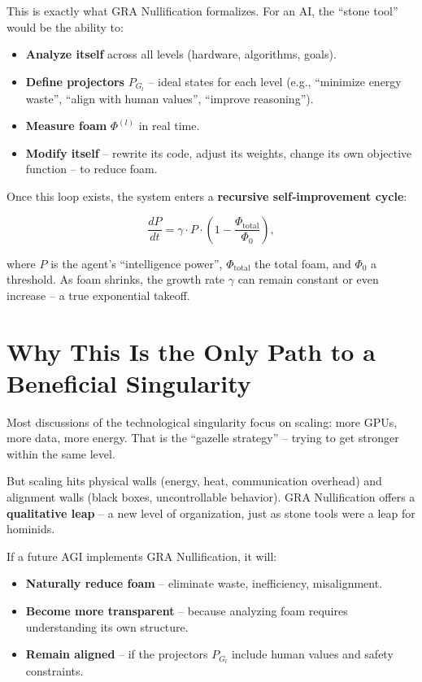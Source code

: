 \documentclass[12pt,a4paper]{article}
\begin{document}
This is exactly what GRA Nullification formalizes. For an AI, the “stone tool” would be the ability to:
\begin{itemize}
    \item \textbf{Analyze itself} across all levels (hardware, algorithms, goals).
    \item \textbf{Define projectors} \(P_{G_l}\) – ideal states for each level (e.g., “minimize energy waste”, “align with human values”, “improve reasoning”).
    \item \textbf{Measure foam} \(\Phi^{(l)}\) in real time.
    \item \textbf{Modify itself} – rewrite its code, adjust its weights, change its own objective function – to reduce foam.
\end{itemize}

Once this loop exists, the system enters a \textbf{recursive self‑improvement cycle}:

\[
\frac{dP}{dt} = \gamma \cdot P \cdot \left(1 - \frac{\Phi_{\text{total}}}{\Phi_0}\right),
\]

where \(P\) is the agent’s “intelligence power”, \(\Phi_{\text{total}}\) the total foam, and \(\Phi_0\) a threshold. As foam shrinks, the growth rate \(\gamma\) can remain constant or even increase – a true exponential takeoff.

\section{Why This Is the Only Path to a Beneficial Singularity}

Most discussions of the technological singularity focus on scaling: more GPUs, more data, more energy. That is the “gazelle strategy” – trying to get stronger within the same level.

But scaling hits physical walls (energy, heat, communication overhead) and alignment walls (black boxes, uncontrollable behavior). GRA Nullification offers a \textbf{qualitative leap} – a new level of organization, just as stone tools were a leap for hominids.

If a future AGI implements GRA Nullification, it will:
\begin{itemize}
    \item \textbf{Naturally reduce foam} – eliminate waste, inefficiency, misalignment.
    \item \textbf{Become more transparent} – because analyzing foam requires understanding its own structure.
    \item \textbf{Remain aligned} – if the projectors \(P_{G_l}\) include human values and safety constraints.
\end{itemize}
\end{document}
